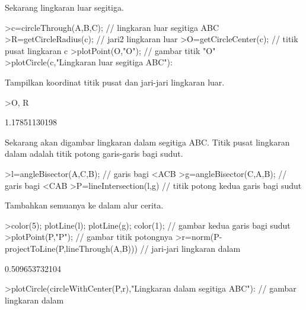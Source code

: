\documentclass[a4paper,10pt]{article}
\begin{document}
\begin{eulernotebook}
\begin{eulercomment}
\begin{eulercomment}
\begin{eulercomment}
\begin{eulercomment}
\begin{eulercomment}
\begin{eulercomment}
\begin{eulercomment}
\begin{eulercomment}
\begin{eulercomment}
\begin{eulercomment}
\begin{eulercomment}
\begin{eulercomment}
\begin{eulercomment}
\begin{eulercomment}
\begin{eulercomment}
\begin{eulercomment}
\begin{eulercomment}
\begin{eulercomment}
\begin{eulercomment}
Sekarang lingkaran luar segitiga.
\end{eulercomment}
\begin{eulerprompt}
>c=circleThrough(A,B,C); // lingkaran luar segitiga ABC
>R=getCircleRadius(c); // jari2 lingkaran luar 
>O=getCircleCenter(c); // titik pusat lingkaran c 
>plotPoint(O,"O"); // gambar titik "O"
>plotCircle(c,"Lingkaran luar segitiga ABC"):
\end{eulerprompt}
\begin{eulercomment}
Tampilkan koordinat titik pusat dan jari-jari lingkaran luar.
\end{eulercomment}
\begin{eulerprompt}
>O, R
\end{eulerprompt}
\begin{euleroutput}
  [1.16667,  1.16667]
  1.17851130198
\end{euleroutput}
\begin{eulercomment}
Sekarang akan digambar lingkaran dalam segitiga ABC. Titik pusat lingkaran dalam adalah
titik potong garis-garis bagi sudut.
\end{eulercomment}
\begin{eulerprompt}
>l=angleBisector(A,C,B); // garis bagi <ACB
>g=angleBisector(C,A,B); // garis bagi <CAB
>P=lineIntersection(l,g) // titik potong kedua garis bagi sudut
\end{eulerprompt}
\begin{euleroutput}
  [0.86038,  0.86038]
\end{euleroutput}
\begin{eulercomment}
Tambahkan semuanya ke dalam alur cerita.
\end{eulercomment}
\begin{eulerprompt}
>color(5); plotLine(l); plotLine(g); color(1); // gambar kedua garis bagi sudut
>plotPoint(P,"P"); // gambar titik potongnya
>r=norm(P-projectToLine(P,lineThrough(A,B))) // jari-jari lingkaran dalam
\end{eulerprompt}
\begin{euleroutput}
  0.509653732104
\end{euleroutput}
\begin{eulerprompt}
>plotCircle(circleWithCenter(P,r),"Lingkaran dalam segitiga ABC"): // gambar lingkaran dalam
\end{eulerprompt}

\end{eulercomment}
\end{eulercomment}
\end{eulercomment}
\end{eulercomment}
\end{eulercomment}
\end{eulercomment}
\end{eulercomment}
\end{eulercomment}
\end{eulercomment}
\end{eulercomment}
\end{eulercomment}
\end{eulercomment}
\end{eulercomment}
\end{eulercomment}
\end{eulercomment}
\end{eulercomment}
\end{eulercomment}
\end{eulercomment}
\end{eulernotebook}
\end{document}
